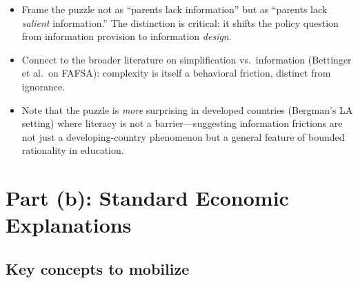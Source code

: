 \documentclass[11pt]{article}
\begin{document}
\begin{itemize}
  \item Frame the puzzle not as ``parents lack information'' but as ``parents lack \emph{salient} information.'' The distinction is critical: it shifts the policy question from information provision to information \emph{design}.
  \item Connect to the broader literature on simplification vs.\ information (Bettinger et al.\ on FAFSA): complexity is itself a behavioral friction, distinct from ignorance.
  \item Note that the puzzle is \emph{more} surprising in developed countries (Bergman's LA setting) where literacy is not a barrier---suggesting information frictions are not just a developing-country phenomenon but a general feature of bounded rationality in education.
\end{itemize}

\section{Part (b): Standard Economic Explanations}

\subsection{Key concepts to mobilize}
\end{document}
